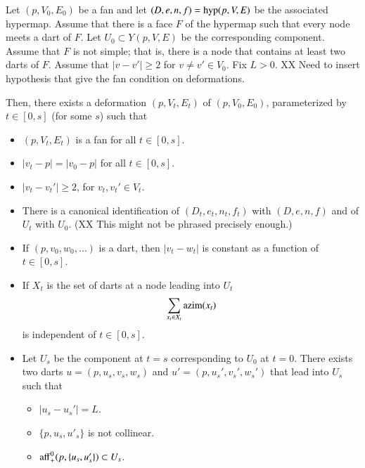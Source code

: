 \begin{lemma}\label{lemma:simple-polygon} 
Let $(p,V_0,E_0)$ be a fan and
let $(D,e,n,f)={\operatorname{hyp}}(p,V,E)$ be the associated hypermap.
Assume that there is a face $F$ of the hypermap such that every
node meets a dart of $F$.  Let $U_0\subset Y(p,V,E)$ be the corresponding
component. 
Assume that $F$ is not simple; that is, there is a node 
that contains at least two darts of $F$.
Assume that $|v-v'|\ge2$ for $v\ne v'\in V_0$.
Fix $L>0$.
XX Need to insert hypothesis that give the fan condition
on deformations.

Then, there exists a deformation
$(p,V_t,E_t)$ of $(p,V_0,E_0)$, parameterized by $t\in[0,s]$ (for some $s$) 
such
that
\begin{itemize}
\item $(p,V_t,E_t)$ is a fan for all $t\in[0,s]$.
\item $|v_t-p| = |v_0-p|$ for all $t\in[0,s]$.
\item $|v_t-v_t'|\ge 2$, for $v_t,v_t'\in V_t$.
\item There is a canonical identification of $(D_t,e_t,n_t,f_t)$
with $(D,e,n,f)$ and of $U_t$ with $U_0$.  (XX This might not be
phrased precisely enough.)
\item If $(p,v_0,w_0,\ldots)$ is a dart, then
   $|v_t-w_t|$ is constant as a function of $t\in[0,s]$.
\item If $X_t$ is the set of darts at a node leading into $U_t$
   $$
   \sum_{x_t\in X_t} {\operatorname{azim}}(x_t)
   $$
is independent of $t\in[0,s]$.
\item 
Let $U_s$ be the component at $t=s$ corresponding to $U_0$ at $t=0$.
There exists two darts $u=(p,u_s,v_s,w_s)$ and
$u'=(p,u_s',v_s',w_s')$ that lead into $U_s$ such that
  \begin{itemize} %
  \item $|u_s-u_s'| = L$.
  \item $\{p,u_s,u'_s\}$ is not collinear.
  \item ${\operatorname{aff}}_+^0(p,\{u_s,u_s'\}) \subset U_s$.
  \end{itemize} %
\end{itemize}
\end{lemma}





